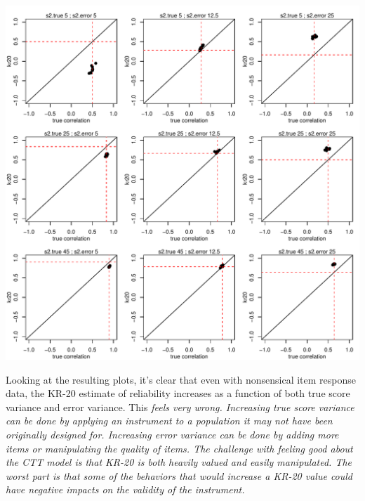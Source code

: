\documentclass{article}\usepackage[]{graphicx}\usepackage[]{color}
\makeatletter
\def\maxwidth{ %
  \ifdim\Gin@nat@width>\linewidth
    \linewidth
  \else
    \Gin@nat@width
  \fi
}
\newenvironment{knitrout}{}{} %
\makeatother
\begin{document}
\begin{knitrout}
\color{fgcolor}
\includegraphics[width=\maxwidth]{figure/unnamed-chunk-4-1} 

\end{knitrout}

Looking at the resulting plots, it's clear that even with nonsensical item response data, the KR-20 estimate of reliability increases as a function of both true score variance and error variance.  This \em feels \em very wrong.  Increasing true score variance can be done by applying an instrument to a population it may not have been originally designed for.  Increasing error variance can be done by adding more items or manipulating the quality of items.  The challenge with feeling good about the CTT model is that KR-20 is both heavily valued and easily manipulated.  The worst part is that some of the behaviors that would increase a KR-20 value could have negative impacts on the validity of the instrument.

\pagebreak
\end{document}
